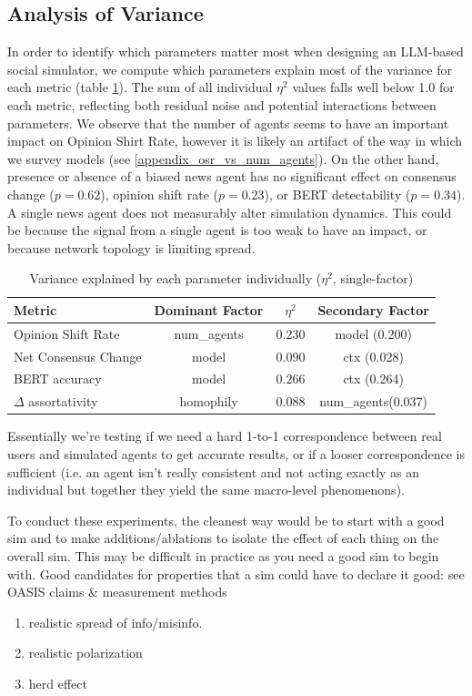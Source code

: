 \documentclass{article} %
\begin{document}
\subsection{Analysis of Variance}

In order to identify which parameters matter most when designing an LLM-based social simulator, we compute which parameters explain most of the variance for each metric (table \ref{tab:anova_factors}). The sum of all individual $\eta^2$ values falls well below 1.0 for each metric, reflecting both residual noise and potential interactions between parameters. We observe that the number of agents seems to have an important impact on Opinion Shirt Rate, however it is likely an artifact of the way in which we survey models (see \ref{appendix_osr_vs_num_agents}). On the other hand, presence or absence of a biased news agent has no significant effect on consensus change ($p = 0.62$), opinion shift rate ($p = 0.23$), or BERT detectability ($p = 0.34$). A single news agent does not measurably alter simulation dynamics. This could be because the signal from a single agent is too weak to have an impact, or because network topology is limiting spread.

\begin{table}[h]
\centering
\begin{tabular}{lccc}
\toprule
Metric & Dominant Factor & $\eta^2$ & Secondary Factor \\
\midrule
Opinion Shift Rate & num\_agents & $\mathbf{0.230}$ & model (0.200) \\
Net Consensus Change & model & $\mathbf{0.090}$ & ctx (0.028) \\
BERT accuracy & model & $\mathbf{0.266}$ & ctx (0.264) \\
$\Delta$ assortativity & homophily & $\mathbf{0.088}$ & num\_agents(0.037) \\
\bottomrule
\end{tabular}
\caption{Variance explained by each parameter individually ($\eta^2$, single-factor)}
\label{tab:anova_factors}
\end{table}

\iffalse
Essentially we're testing if we need a hard 1-to-1 correspondence between real users and simulated agents to get accurate results, or if a looser correspondence is sufficient (i.e. an agent isn't really consistent and not acting exactly as an individual but together they yield the same macro-level phenomenons).

To conduct these experiments, the cleanest way would be to start with a good sim and to make additions/ablations to isolate the effect of each thing on the overall sim. This may be difficult in practice as you need a good sim to begin with. Good candidates for properties that a sim could have to declare it good: see OASIS claims \& measurement methods
\begin{enumerate}
    \item realistic spread of info/misinfo.
    \item realistic polarization
    \item herd effect
\end{enumerate}
\end{document}
